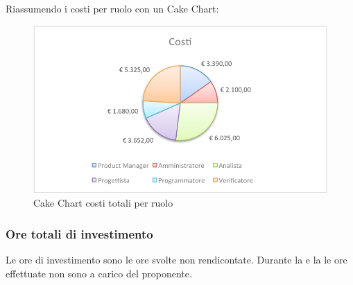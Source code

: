 				Riassumendo i costi per ruolo con un Cake Chart:
				\begin{figure}[H]\centering
					\includegraphics[width=\textwidth]{PianoDiProgetto/Pics/ChartTotCosti.pdf}
					\caption{Cake Chart costi totali per ruolo}
				\end{figure}
		\subsubsection{Ore totali di investimento}
		Le ore di investimento sono le ore svolte non rendicontate. Durante la  e la  le ore effettuate non sono a carico del proponente.
